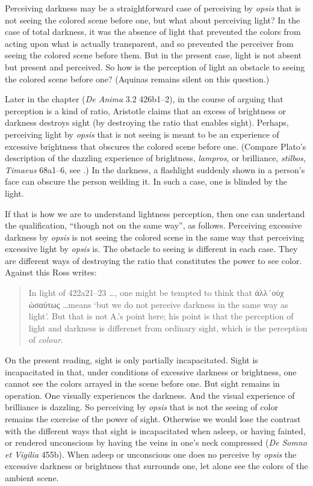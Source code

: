 Perceiving darkness may be a straightforward case of perceiving by \emph{opsis} that is not seeing the colored scene before one, but what about perceiving light? In the case of total darkness, it was the absence of light that prevented the colors from acting upon what is actually transparent, and so prevented the perceiver from seeing the colored scene before them. But in the present case, light is not absent but present and perceived. So how is the perception of light an obstacle to seeing the colored scene before one? (Aquinas remains silent on this question.)


Later in the chapter (\emph{De Anima} 3.2 426b1–2), in the course of arguing that perception is a kind of ratio, Aristotle claims that an excess of brightness or darkness destroys sight (by destroying the ratio that enables sight). Perhaps, perceiving light by \emph{opsis} that is not seeing is meant to be an experience of excessive brightness that obscures the colored scene before one. (Compare Plato's description of the dazzling experience of brightness, \emph{lampros}, or brilliance, \emph{stilbos}, \emph{Timaeus} 68a1–6, see \citealt[72–7]{Kalderon:2022kl}.) In the darkness, a flashlight suddenly shown in a person's face can obscure the person weilding it. In such a case, one is blinded by the light.

If that is how we are to understand lightness perception, then one can undertand the qualification, ``though not on the same way'', as follows. Perceiving excessive darkness by \emph{opsis} is not seeing the colored scene in the same way that perceiving excessive light by \emph{opsis} is. The obstacle to seeing is different in each case. They are different ways of destroying the ratio that constitutes the power to see color. Against this Ross writes:
\begin{quote}
	In light of 422a21–23 \ldots, one might be tempted to think that {\sbl άλλ´ούχ ώσαύτως} \ldots means `but we do not perceive darkness in the same way as light'. But that is not A.'s point here; his point is that the perception of light and darkness is differenet from ordinary sight, which is the perception of \emph{colour}. \citep[275]{Ross:1961uq}
\end{quote}

On the present reading, sight is only partially incapacitated. Sight is incapacitated in that, under conditions of excessive darkness or brightness, one cannot see the colors arrayed in the scene before one. But sight remains in operation. One visually experiences the darkness. And the visual experience of brilliance is dazzling. So perceiving by \emph{opsis} that is not the seeing of color remains the exercise of the power of sight. Otherwise we would lose the contrast with the different ways that sight is incapacitated when asleep, or having fainted, or rendered unconscious by having the veins in one's neck compressed (\emph{De Somno et Vigilia} 455b). When asleep or unconscious one does no perceive by \emph{opsis} the excessive darkness or brightness that surrounds one, let alone see the colors of the ambient scene.

